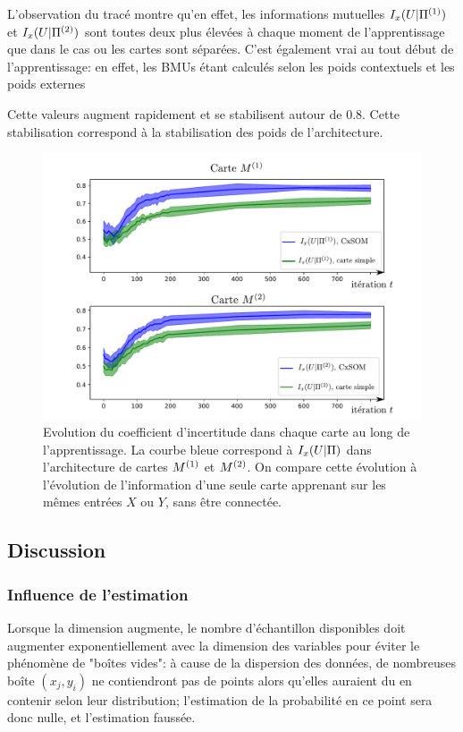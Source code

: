 L'observation du tracé montre qu'en effet, les informations mutuelles $I_x(U|\Pi^{({1})})$ et $I_x(U|\Pi^{({2})})$ sont toutes deux plus élevées à chaque moment de l'apprentissage que dans le cas ou les cartes sont séparées. C'est également vrai au tout début de l'apprentissage: en effet, les BMUs étant calculés selon les poids contextuels et les poids externes

Cette valeurs augment rapidement et se stabilisent autour de 0.8. Cette stabilisation correspond à la stabilisation des poids de l'architecture.

\begin{figure}
\includegraphics[width=\textwidth]{evolution_MI_binning}
\caption{Evolution du coefficient d'incertitude dans chaque carte au long de l'apprentissage. La courbe bleue correspond à $I_x(U|\Pi)$ dans l'architecture de cartes $M^{({1})}$ et $M^{({2})}$. On compare cette évolution à l'évolution de l'information d'une seule carte apprenant sur les mêmes entrées $X$ ou $Y$, sans être connectée.}
\label{fig:MI_evol}
\end{figure}

\subsection{Discussion}
\subsubsection{Influence de l'estimation}
Lorsque la dimension augmente, le nombre d'échantillon disponibles doit augmenter exponentiellement avec la dimension des variables pour éviter le phénomène de "boîtes vides": à cause de la dispersion des données, de nombreuses boîte $(x_j,y_i)$ ne contiendront pas de points alors qu'elles auraient du en contenir selon leur distribution; l'estimation de la probabilité en ce point sera donc nulle, et l'estimation faussée. 

